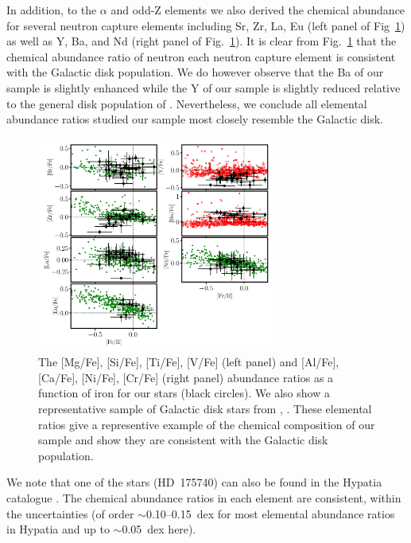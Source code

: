 \documentclass[a4paper,fleqn,usenatbib]{mnras}
\begin{document}
In addition, to the $\alpha$ and odd-Z elements we also derived the chemical abundance for several neutron capture elements including Sr, Zr, La, Eu (left panel of Fig~\ref{fig:ncap}) as well as Y, Ba, and Nd (right panel of Fig.~\ref{fig:ncap}).  It is clear from Fig.~\ref{fig:ncap}  that the chemical abundance ratio of neutron each neutron capture element is consistent with the Galactic disk population. We do however observe that the Ba of our sample is slightly enhanced while the Y of our sample is slightly reduced relative to the general disk population of \cite{Bensby2014}. Nevertheless, we conclude all elemental abundance ratios studied our sample most closely resemble the Galactic disk. 
\begin{figure}
\noindent\includegraphics[width=0.7\textwidth,keepaspectratio]{chem_ncap_pope.pdf}

\caption{\label{fig:ncap}
The [Mg/Fe], [Si/Fe], [Ti/Fe], [V/Fe] (left panel) and [Al/Fe], [Ca/Fe], [Ni/Fe], [Cr/Fe] (right panel) abundance ratios as a function of iron for our stars (black circles). We also show a representative sample of Galactic disk stars from \citet[open red square,][]{Bensby2014}, \citet[green circles][]{Battistini2016}. These elemental ratios give a representive example of the chemical composition of our sample and show they are consistent with the Galactic disk population. } %
\end{figure}


We note that one of the stars (HD~175740) can also be found in the Hypatia catalogue \citep{hypatia}. The chemical abundance ratios in each element are consistent, within the uncertainties (of order $\sim$0.10--0.15~dex for most elemental abundance ratios in Hypatia and up to $\sim$0.05~dex here). 
\end{document}
